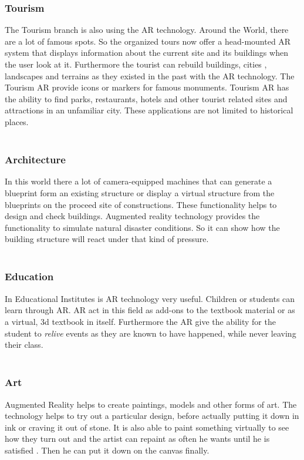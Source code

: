  \subsubsection{Tourism}
 The Tourism branch is also using the AR technology.  Around the World, there are a lot of famous spots. So the organized tours now offer a head-mounted AR system that displays information about the current site and its buildings when the user look at it.  Furthermore the tourist can rebuild buildings, cities , landscapes and terrains as they existed in the past with the AR technology. The Tourism AR provide icons or markers for famous monuments. Tourism AR has the ability to find parks, restaurants, hotels and other tourist related sites and attractions in an unfamiliar city. These applications are not limited to historical places.\cite{AugmentedBook}
 \\
 \\
 \subsubsection{Architecture}
 In this world there a lot of camera-equipped machines that can generate a blueprint form an existing structure or display a virtual structure from the blueprints on the proceed site of constructions.  These functionality helps to design and check buildings. Augmented  reality technology provides the functionality to simulate natural disaster conditions. So it can show how the building structure will react under that kind of pressure.\cite{AugmentedBook}
 \\
 \\
 \subsubsection{Education}
 In Educational Institutes is AR technology very useful. Children or students can learn through AR. AR act in this field as  add-ons to the textbook material or as a virtual, 3d textbook in itself. Furthermore the AR give the ability for the student to \textit{relive} events as they are known to have happened, while never leaving their class.\cite{AugmentedBook}
 \\
 \\
 \subsubsection{Art}
 Augmented Reality helps  to create paintings, models and other forms of art.  The technology helps  to try out a particular design, before  actually putting it down in ink or craving it out of stone. It is also able to paint something virtually to see how they turn out and the artist can repaint as often he wants until he is satisfied . Then he can put it down on the canvas finally.\cite{AugmentedBook}
 \\
